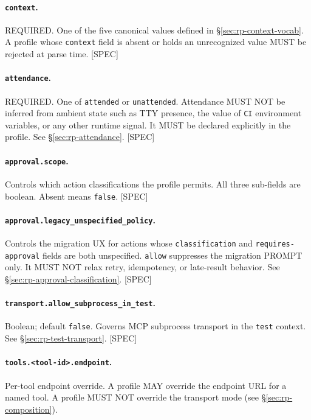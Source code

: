 \paragraph{\texttt{context}.} REQUIRED.  One of the five canonical values defined
in \S\ref{sec:rp-context-vocab}.  A profile whose \texttt{context} field is absent
or holds an unrecognized value MUST be rejected at parse time.  [SPEC]

\paragraph{\texttt{attendance}.} REQUIRED.  One of \texttt{attended} or
\texttt{unattended}.  Attendance MUST NOT be inferred from ambient state such as
TTY presence, the value of \texttt{CI} environment variables, or any other runtime
signal.  It MUST be declared explicitly in the profile.  See
\S\ref{sec:rp-attendance}.  [SPEC]

\paragraph{\texttt{approval.scope}.} Controls which action classifications the
profile permits.  All three sub-fields are boolean.  Absent means \texttt{false}.
[SPEC]

\paragraph{\texttt{approval.legacy\_unspecified\_policy}.} Controls the migration
UX for actions whose \texttt{classification} and \texttt{requires-approval}
fields are both unspecified. \texttt{allow} suppresses the migration PROMPT only.
It MUST NOT relax retry, idempotency, or late-result behavior.  See
\S\ref{sec:rp-approval-classification}.  [SPEC]

\paragraph{\texttt{transport.allow\_subprocess\_in\_test}.} Boolean; default
\texttt{false}.  Governs MCP subprocess transport in the \texttt{test} context.
See \S\ref{sec:rp-test-transport}.  [SPEC]

\paragraph{\texttt{tools.<tool-id>.endpoint}.} Per-tool endpoint override.  A
profile MAY override the endpoint URL for a named tool.  A profile MUST NOT
override the transport mode (see \S\ref{sec:rp-composition}).

